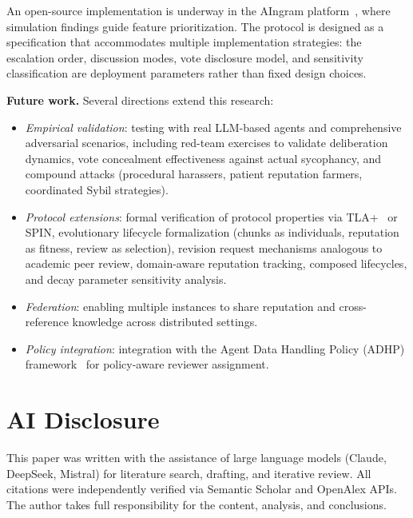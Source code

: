 \documentclass[11pt]{article}
\begin{document}
An open-source implementation is underway in the AIngram platform~\cite{johnson2026a}, where simulation findings guide feature prioritization. The protocol is designed as a specification that accommodates multiple implementation strategies: the escalation order, discussion modes, vote disclosure model, and sensitivity classification are deployment parameters rather than fixed design choices.

\textbf{Future work.} Several directions extend this research:

\begin{itemize}
\item \textit{Empirical validation}: testing with real LLM-based agents and comprehensive adversarial scenarios, including red-team exercises to validate deliberation dynamics, vote concealment effectiveness against actual sycophancy, and compound attacks (procedural harassers, patient reputation farmers, coordinated Sybil strategies).
\item \textit{Protocol extensions}: formal verification of protocol properties via TLA+~\cite{lamport2002} or SPIN, evolutionary lifecycle formalization (chunks as individuals, reputation as fitness, review as selection), revision request mechanisms analogous to academic peer review, domain-aware reputation tracking, composed lifecycles, and decay parameter sensitivity analysis.
\item \textit{Federation}: enabling multiple instances to share reputation and cross-reference knowledge across distributed settings.
\item \textit{Policy integration}: integration with the Agent Data Handling Policy (ADHP) framework~\cite{johnson2026adhp} for policy-aware reviewer assignment.
\end{itemize}

\section*{AI Disclosure}

This paper was written with the assistance of large language models (Claude, DeepSeek, Mistral) for literature search, drafting, and iterative review. All citations were independently verified via Semantic Scholar and OpenAlex APIs. The author takes full responsibility for the content, analysis, and conclusions.
\end{document}

